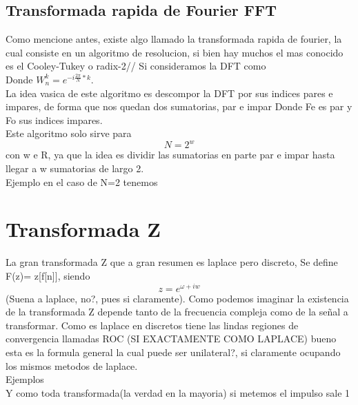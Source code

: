 \subsection{Transformada rapida de Fourier FFT}
Como mencione antes, existe algo llamado la transformada rapida de fourier, la cual consiste en un algoritmo de resolucion, si bien hay muchos el mas conocido es el Cooley-Tukey o radix-2//
Si consideramos la DFT como 
 \\ Donde $W_n^k=e^{-i\frac{2\pi}{N}*k}$. \\
La idea vasica de este algoritmo es descompor la DFT por sus indices pares e impares, de forma que nos quedan dos sumatorias, par e impar
Donde Fe es par y Fo sus indices impares. \\ Este algoritmo solo sirve para $$N=2^w$$ con w e R, ya que la idea es dividir las sumatorias en parte par e impar hasta llegar a w sumatorias de largo 2. \\ Ejemplo en el caso de N=2 tenemos






\newpage
\section{Transformada Z}
La gran transformada Z que a gran resumen es laplace pero discreto, Se define F(z)= z[f[n]], siendo $$z=e^{\omega + iw}$$ (Suena a laplace, no?, pues si claramente). Como podemos imaginar la existencia de la transformada Z depende tanto de la frecuencia compleja como de la señal a transformar. Como es laplace en discretos tiene las lindas regiones de convergencia llamadas ROC (SI EXACTAMENTE COMO LAPLACE)
bueno esta es la formula general la cual puede ser unilateral?, si claramente ocupando los mismos metodos de laplace.\\ Ejemplos
\\ Y como toda transformada(la verdad en la mayoria) si metemos el impulso sale 1
